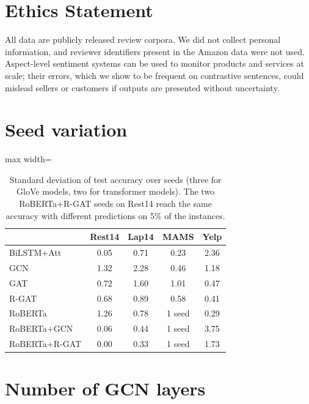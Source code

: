 \documentclass[11pt]{article}
\begin{document}
\section*{Ethics Statement}

All data are publicly released review corpora. We did not collect personal information, and reviewer identifiers present in the Amazon data were not used. Aspect-level sentiment systems can be used to monitor products and services at scale; their errors, which we show to be frequent on contrastive sentences, could mislead sellers or customers if outputs are presented without uncertainty.



\appendix

\section{Seed variation}
\label{app:std}

\begin{table}[h]
\centering
\small
\setlength{\tabcolsep}{3pt}
\begin{adjustbox}{max width=\columnwidth}
\begin{tabular}{lcccc}
\toprule
 & Rest14 & Lap14 & MAMS & Yelp \\
\midrule
BiLSTM+Att & 0.05 & 0.71 & 0.23 & 2.36 \\
GCN & 1.32 & 2.28 & 0.46 & 1.18 \\
GAT & 0.72 & 1.60 & 1.01 & 0.47 \\
R-GAT & 0.68 & 0.89 & 0.58 & 0.41 \\
RoBERTa & 1.26 & 0.78 & 1 seed & 0.29 \\
RoBERTa+GCN & 0.06 & 0.44 & 1 seed & 3.75 \\
RoBERTa+R-GAT & 0.00 & 0.33 & 1 seed & 1.73 \\
\bottomrule
\end{tabular}
\end{adjustbox}
\caption{Standard deviation of test accuracy over seeds (three for GloVe models, two for transformer models). The two RoBERTa+R-GAT seeds on Rest14 reach the same accuracy with different predictions on 5\% of the instances.}
\end{table}

\section{Number of GCN layers}
\label{app:layers}
\end{document}
